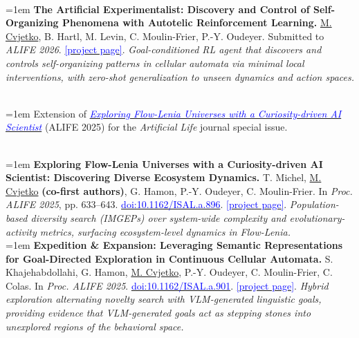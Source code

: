\documentclass[a4paper]{article}
\begin{document}
\begin{description}[leftmargin=1.5em, style=unboxed, font=\normalfont\bfseries, itemsep=0.4em, parsep=0em, topsep=0.2em]
    \item[Under review] ~\\[0.2em]
    \hangindent=1em \textbf{The Artificial Experimentalist: Discovery and Control of Self-Organizing Phenomena with Autotelic Reinforcement Learning.} \underline{M. Cvjetko}, B. Hartl, M. Levin, C. Moulin-Frier, P.-Y. Oudeyer. Submitted to \textit{ALIFE 2026}. \href{https://developmentalsystems.org/carl/}{\textcolor{blue}{[project page]}}. \textit{Goal-conditioned RL agent that discovers and controls self-organizing patterns in cellular automata via minimal local interventions, with zero-shot generalization to unseen dynamics and action spaces.}
    \item[Journal (invited, in preparation)] ~\\[0.2em]
    \hangindent=1em Extension of \textit{\href{https://developmentalsystems.org/Exploring-Flow-Lenia-Universes/}{\textcolor{blue}{Exploring Flow-Lenia Universes with a Curiosity-driven AI Scientist}}} (ALIFE 2025) for the \textit{Artificial Life} journal special issue.
    \item[Conference papers] ~\\[0.2em]
    \hangindent=1em \textbf{Exploring Flow-Lenia Universes with a Curiosity-driven AI Scientist: Discovering Diverse Ecosystem Dynamics.} T. Michel, \underline{M. Cvjetko} \textbf{(co-first authors)}, G. Hamon, P.-Y. Oudeyer, C. Moulin-Frier. In \textit{Proc. ALIFE 2025}, pp. 633--643. \href{https://doi.org/10.1162/ISAL.a.896}{\textcolor{blue}{doi:10.1162/ISAL.a.896}}. \href{https://developmentalsystems.org/Exploring-Flow-Lenia-Universes/}{\textcolor{blue}{[project page]}}. \textit{Population-based diversity search (IMGEPs) over system-wide complexity and evolutionary-activity metrics, surfacing ecosystem-level dynamics in Flow-Lenia.}\\[0.3em]
    \hangindent=1em \textbf{Expedition \& Expansion: Leveraging Semantic Representations for Goal-Directed Exploration in Continuous Cellular Automata.} S. Khajehabdollahi, G. Hamon, \underline{M. Cvjetko}, P.-Y. Oudeyer, C. Moulin-Frier, C. Colas. In \textit{Proc. ALIFE 2025}. \href{https://doi.org/10.1162/ISAL.a.901}{\textcolor{blue}{doi:10.1162/ISAL.a.901}}. \href{https://developmentalsystems.org/expedition_expansion/}{\textcolor{blue}{[project page]}}. \textit{Hybrid exploration alternating novelty search with VLM-generated linguistic goals, providing evidence that VLM-generated goals act as stepping stones into unexplored regions of the behavioral space.}

\end{description}
\end{document}
